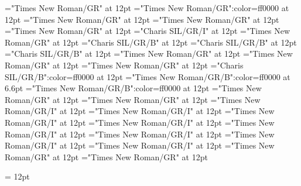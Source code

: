 \documentclass[a4paper]{article}
\begin{document}
\pagestyle{plain}
\sloppy
\setlength{\parfillskip}{0pt plus 1fil}
\font\spanen="Times New Roman/GR" at 12pt
\font\spanur="Times New Roman/GR":color=ff0000 at 12pt
\font\diven="Times New Roman/GR" at 12pt
\font\divur="Times New Roman/GR" at 12pt
\font\xitemxitemdefinitionbefore="Times New Roman/GR" at 12pt
\font\xitemxitemexamplebefore="Charis SIL/GR/I" at 12pt
\font\xitemxitemexamplesbefore="Times New Roman/GR" at 12pt
\font\xitemxitemheadwordbefore="Charis SIL/GR/B" at 12pt
\font\xitemxitemheadwordminorbefore="Charis SIL/GR/B" at 12pt
\font\xitemxitemLexEntrypublishRootMinorPrimaryTargetHeadWordRefbefore="Charis SIL/GR/B" at 12pt
\font\xitemxitemlexreftargetsbefore="Times New Roman/GR" at 12pt
\font{}="Times New Roman/GR" at 12pt
\font\entryletDatadicBody="Times New Roman/GR" at 12pt
\font\headwordurentryletDatadicBody="Charis SIL/GR/B":color=ff0000 at 12pt
\font\xhomographnumberheadwordurentryletDatadicBody="Times New Roman/GR/B":color=ff0000 at 6.6pt
\font\spanenheadwordurentryletDatadicBody="Times New Roman/GR/B":color=ff0000 at 12pt
\font\sensesentryletDatadicBody="Times New Roman/GR" at 12pt
\font\sensesensesentryletDatadicBody="Times New Roman/GR" at 12pt
\font\grammaticalinfosensesensesentryletDatadicBody="Times New Roman/GR/I" at 12pt
\font\partofspeechengrammaticalinfosensesensesentryletDatadicBody="Times New Roman/GR/I" at 12pt
\font\spanenpartofspeechengrammaticalinfosensesensesentryletDatadicBody="Times New Roman/GR/I" at 12pt
\font\slotsgrammaticalinfosensesensesentryletDatadicBody="Times New Roman/GR/I" at 12pt
\font\spanenslotsgrammaticalinfosensesensesentryletDatadicBody="Times New Roman/GR/I" at 12pt
\font\slotnameenslotsgrammaticalinfosensesensesentryletDatadicBody="Times New Roman/GR/I" at 12pt
\font\spanenslotnameenslotsgrammaticalinfosensesensesentryletDatadicBody="Times New Roman/GR/I" at 12pt
\font\spanengrammaticalinfosensesensesentryletDatadicBody="Times New Roman/GR/I" at 12pt
\font{}="Times New Roman/GR" at 12pt
\font\spanendefinitionensensesensesentryletDatadicBody="Times New Roman/GR" at 12pt

\mbox{} 
\newpage 
\newpage 
\setcounter{page}{1} 
\pagestyle{fancy} 
\setlength{\columnsep}{1.5em} 
\setlength\columnseprule{0.4pt} 
\begin{multicols}{2}{\raggedleft} \begin{spacing}{1.5}
\hangindent= 12pt
  \spanenslotsgrammaticalinfosensesensesentryletDatadicBody{: }  \end{spacing}
 \end{multicols}
\end{document}
